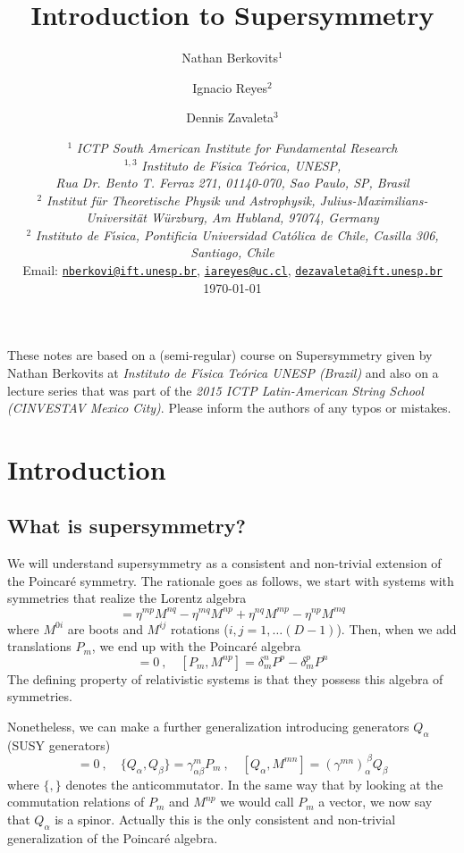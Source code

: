 \documentclass[a4paper,12pt]{article}
\title{\Huge Introduction to Supersymmetry
\bigskip}
\author{Nathan Berkovits$^1$ \and Ignacio Reyes$^2$ \and Dennis Zavaleta$^3$ }
\date{\bigskip
$^1$ \emph{ICTP South American Institute for Fundamental Research} \\%
$^{1,3}$ \emph{Instituto de F\'\i sica Te\'orica, UNESP,} \\%
\emph{Rua Dr. Bento T. Ferraz 271, 01140-070, Sao Paulo, SP, Brasil} \\%
$^2$ \emph{ Institut f\"ur Theoretische Physik und Astrophysik, Julius-Maximilians-Universit\"at W\"urzburg, Am Hubland, 97074, Germany} \\%
$^2$ \emph{Instituto de F\'\i sica, Pontificia Universidad Cat\'olica de Chile, Casilla 306, Santiago, Chile} \\[1 \baselineskip]%
Email: \href{mailto:nberkovi@ift.unesp.br}{\tt nberkovi@ift.unesp.br}, \href{mailto:iareyes@uc.cl}{\tt iareyes@uc.cl}, \href{dezavaleta@ift.unesp.br}{\tt dezavaleta@ift.unesp.br}\\[2\baselineskip] %
\today
}
\numberwithin{equation}{section}
\numberwithin{exe}{section}
\renewcommand{\a}{{\alpha}}
\renewcommand{\b}{{\beta}}
\newcommand{\g}{{\gamma}}
\renewcommand{\d}{{\delta}}
\begin{document}
\maketitle

\noindent These notes are based on a (semi-regular) course on Supersymmetry given by Nathan Berkovits at {\it Instituto de F\'\i sica Te\'orica UNESP (Brazil)} and also on a lecture series that was part of the {\it 2015 ICTP Latin-American String School (CINVESTAV Mexico City)}. Please inform the authors of any typos or mistakes.


\tableofcontents

\newpage

\section{Introduction}

\subsection{What is supersymmetry?}
We will understand supersymmetry as a consistent and non-trivial extension of the Poincar\'e symmetry. The rationale goes as follows, we start with systems with symmetries that realize the Lorentz algebra
	\begin{equation}
	[M^{mn}, M^{pq}] = \eta^{mp}M^{nq} - \eta^{mq} M^{np} + \eta^{nq} M^{mp} - \eta^{np} M^{mq}
	\end{equation}
where $M^{0i}$ are boots and $M^{ij}$ rotations ($i,j=1,\ldots (D-1)$). Then, when we add translations $P_m$, we end up with the Poincar\'e algebra
	\begin{equation}
	[P_m, P_n] = 0\ ,\quad [P_m, M^{np}] = \d^n_m P^p - \d^p_m P^n
	\end{equation}
The defining property of relativistic systems is that they possess this algebra of symmetries.

Nonetheless, we can make a further generalization introducing generators $Q_\a$ (SUSY generators)
	\begin{equation}
	[Q_\a, P_m] = 0\ ,\quad \{Q_\a, Q_\b\} = \g^m_{\a\b} P_m\ ,\quad [Q_\a, M^{mn}] = (\g^{mn})_\a^{\ \b} Q_\b
	\end{equation}
where $\{,\}$ denotes the anticommutator. In the same way that by looking at the commutation relations of $P_m$ and $M^{np}$ we would call $P_m$ a vector, we now say that $Q_\a$ is a spinor. Actually this is the only consistent and non-trivial generalization of the Poincar\'e algebra.
\end{document}
